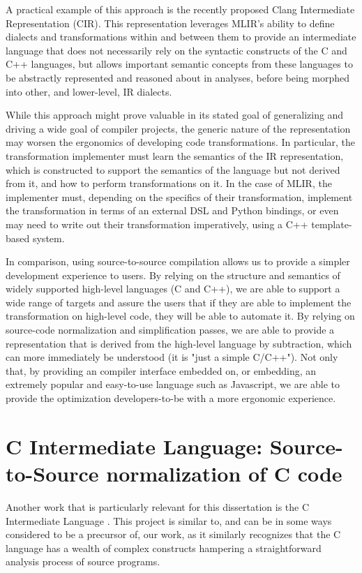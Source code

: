 A practical example of this approach is the recently proposed Clang Intermediate Representation \cite{CirRfc} (CIR). This representation leverages MLIR's ability to define dialects and transformations within and between them to provide an intermediate language that does not necessarily rely on the syntactic constructs of the C and C++ languages, but allows important semantic concepts from these languages to be abstractly represented and reasoned about in analyses, before being morphed into other, and lower-level, IR dialects.

While this approach might prove valuable in its stated goal of generalizing and driving a wide goal of compiler projects, the generic nature of the representation may worsen the ergonomics of developing code transformations. In particular, the transformation implementer must learn the semantics of the IR representation, which is constructed to support the semantics of the language but not derived from it, and how to perform transformations on it. In the case of MLIR, the implementer must, depending on the specifics of their transformation, implement the transformation in terms of an external DSL and Python bindings, or even may need to write out their transformation imperatively, using a C++ template-based system.

In comparison, using source-to-source compilation allows us to provide a simpler development experience to users. By relying on the structure and semantics of widely supported high-level languages (C and C++), we are able to support a wide range of targets and assure the users that if they are able to implement the transformation on high-level code, they will be able to automate it. By relying on source-code normalization and simplification passes, we are able to provide a representation that is derived from the high-level language by subtraction, which can more immediately be understood (it is "just a simple C/C++"). Not only that, by providing an compiler interface embedded on, or embedding, an extremely popular and easy-to-use language such as Javascript, we are able to provide the optimization developers-to-be with a more ergonomic experience.

\section{C Intermediate Language: Source-to-Source normalization of C code}

Another work that is particularly relevant for this dissertation is the C Intermediate Language \cite{Necula2002}. This project is similar to, and can be in some ways considered to be a precursor of, our work, as it similarly recognizes that the C language has a wealth of complex constructs hampering a straightforward analysis process of source programs.

